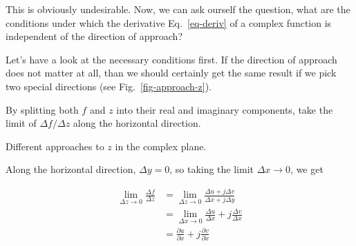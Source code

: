 This is obviously undesirable. Now, we can ask ourself the question, what are the conditions under which the derivative Eq.~\ref{eq-deriv} of a complex function is independent of the direction of approach?

Let's have a look at the necessary conditions first. If the direction of approach does not matter at all, than we should certainly get the same result if we pick two special directions (see Fig.~\ref{fig-approach-z}).

\begin{cue}
 By splitting both $f$ and $z$ into their real and imaginary components, take the limit of $\Delta f / \Delta z$ along the horizontal direction.
\end{cue}

\begin{marginfigure}
\caption{Different approaches to $z$ in the complex plane.}
\label{fig-approach-z}
\end{marginfigure}

Along the horizontal direction, $\Delta y = 0$, so taking the limit $\Delta x \to 0$, we get

\begin{align}
\lim_{\Delta z \to 0} \frac{\Delta f}{\Delta z}
& = \lim_{\Delta z \to 0} \frac{\Delta u + j \Delta v}{\Delta x + j \Delta y}
\nonumber \\
& = \lim_{\Delta x \to 0} \frac{\Delta u}{\Delta x} + j \frac{\Delta v}{\Delta
x} \nonumber \\
& = \frac{\partial u}{\partial x} + j \frac{\partial v}{\partial
x}\label{eq-deriv-dx}
\end{align} 

